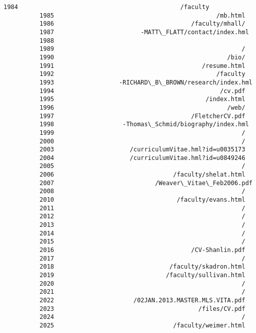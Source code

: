 \documentclass[11pt]{article}
\begin{document}
\begin{Verbatim}[commandchars=\\\{\}]
          1984                                             /faculty
          1985                                             /mb.html
          1986                                      /faculty/mhall/
          1987                        -MATT\_FLATT/contact/index.hml
          1988                                                     
          1989                                                    /
          1990                                                /bio/
          1991                                         /resume.html
          1992                                             /faculty
          1993                  -RICHARD\_B\_BROWN/research/index.hml
          1994                                              /cv.pdf
          1995                                          /index.html
          1996                                                /web/
          1997                                      /FletcherCV.pdf
          1998                   -Thomas\_Schmid/biography/index.hml
          1999                                                    /
          2000                                                    /
          2003                     /curriculumVitae.hml?id=u0035173
          2004                     /curriculumVitae.hml?id=u0849246
          2005                                                    /
          2006                                 /faculty/shelat.html
          2007                            /Weaver\_Vitae\_Feb2006.pdf
          2008                                                    /
          2010                                  /faculty/evans.html
          2011                                                    /
          2012                                                    /
          2013                                                    /
          2014                                                    /
          2015                                                    /
          2016                                      /CV-Shanlin.pdf
          2017                                                    /
          2018                                /faculty/skadron.html
          2019                               /faculty/sullivan.html
          2020                                                    /
          2021                                                    /
          2022                      /02JAN.2013.MASTER.MLS.VITA.pdf
          2023                                        /files/CV.pdf
          2024                                                    /
          2025                                 /faculty/weimer.html

\end{Verbatim}
\end{document}
